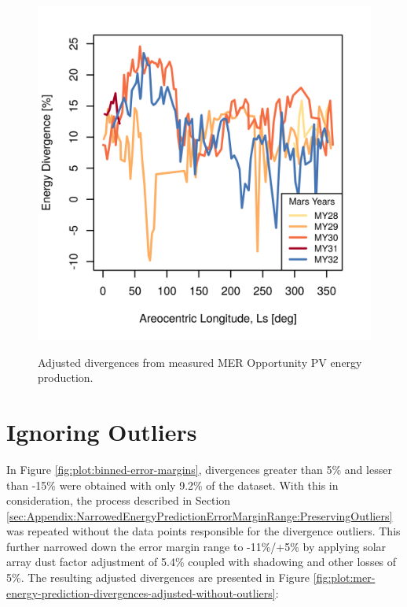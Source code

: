 \begin{figure}[h]
  \centering
  \hypersetup{linkcolor=captionTextColor}
  \includegraphics[width=0.8\linewidth]{sections/appendix/energy-error-margin/plots/energy-prediction-divergences-from-my28-to-my32-adjusted.png}\\
  \caption[Adjusted divergences from measured \ac{MER} Opportunity PV energy production]
          {Adjusted divergences from measured \ac{MER} Opportunity PV energy production.}
  \label{fig:plot:mer-energy-prediction-divergences-adjusted}
\end{figure}

\clearpage

\section{Ignoring Outliers}
\label{sec:Appendix:NarrowedEnergyPredictionErrorMarginRange:IgnoringOutliers}

In Figure \ref{fig:plot:binned-error-margins}, divergences greater than 5\% and lesser than -15\% were obtained with only 9.2\% of the dataset. With this in consideration, the process described in Section \ref{sec:Appendix:NarrowedEnergyPredictionErrorMarginRange:PreservingOutliers} was repeated without the data points responsible for the divergence outliers. This further narrowed down the error margin range to -11\%/+5\% by applying solar array dust factor adjustment of 5.4\% coupled with shadowing and other losses of 5\%. The resulting adjusted divergences are presented in Figure \ref{fig:plot:mer-energy-prediction-divergences-adjusted-without-outliers}:


